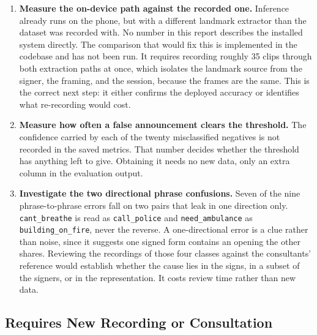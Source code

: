 \begin{enumerate}
    \item \textbf{Measure the on-device path against the recorded one.} Inference already runs on the phone, but with a different landmark extractor than the dataset was recorded with. No number in this report describes the installed system directly. The comparison that would fix this is implemented in the codebase and has not been run. It requires recording roughly 35 clips through both extraction paths at once, which isolates the landmark source from the signer, the framing, and the session, because the frames are the same. This is the correct next step: it either confirms the deployed accuracy or identifies what re-recording would cost.

    \item \textbf{Measure how often a false announcement clears the threshold.} The confidence carried by each of the twenty misclassified negatives is not recorded in the saved metrics. That number decides whether the threshold has anything left to give. Obtaining it needs no new data, only an extra column in the evaluation output.

    \item \textbf{Investigate the two directional phrase confusions.} Seven of the nine phrase-to-phrase errors fall on two pairs that leak in one direction only. \texttt{cant\_breathe} is read as \texttt{call\_police} and \texttt{need\_ambulance} as \texttt{building\_on\_fire}, never the reverse. A one-directional error is a clue rather than noise, since it suggests one signed form contains an opening the other shares. Reviewing the recordings of those four classes against the consultants' reference would establish whether the cause lies in the signs, in a subset of the signers, or in the representation. It costs review time rather than new data.
\end{enumerate}

\subsection{Requires New Recording or Consultation}

